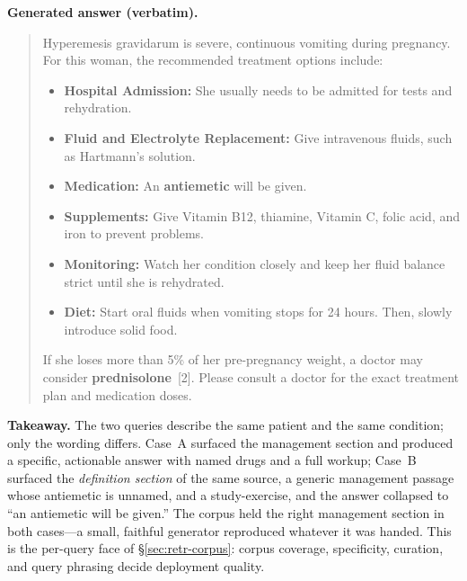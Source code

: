 \smallskip
\noindent\textbf{Generated answer (verbatim).}
\begin{quote}\small
Hyperemesis gravidarum is severe, continuous vomiting during pregnancy. For
this woman, the recommended treatment options include:
\begin{itemize}\setlength{\itemsep}{0pt}
  \item \textbf{Hospital Admission:} She usually needs to be admitted for
  tests and rehydration.
  \item \textbf{Fluid and Electrolyte Replacement:} Give intravenous fluids,
  such as Hartmann's solution.
  \item \textbf{Medication:} An \textbf{antiemetic} will be given.
  \item \textbf{Supplements:} Give Vitamin B12, thiamine, Vitamin C, folic
  acid, and iron to prevent problems.
  \item \textbf{Monitoring:} Watch her condition closely and keep her fluid
  balance strict until she is rehydrated.
  \item \textbf{Diet:} Start oral fluids when vomiting stops for 24 hours.
  Then, slowly introduce solid food.
\end{itemize}
If she loses more than 5\% of her pre-pregnancy weight, a doctor may consider
\textbf{prednisolone}~[2]. Please consult a doctor for the exact treatment
plan and medication doses.
\end{quote}

\smallskip
\noindent\textbf{Takeaway.} The two queries describe the same patient and the
same condition; only the wording differs. Case~A surfaced the management
section and produced a specific, actionable answer with named drugs and a full
workup; Case~B surfaced the \emph{definition section} of the same source, a
generic management passage whose antiemetic is unnamed, and a study-exercise,
and the answer collapsed to ``an antiemetic will be given.'' The corpus held
the right management section in both cases---a small, faithful generator
reproduced whatever it was handed. This is the per-query face of
\S\ref{sec:retr-corpus}: corpus coverage, specificity, curation, and query
phrasing decide deployment quality.
